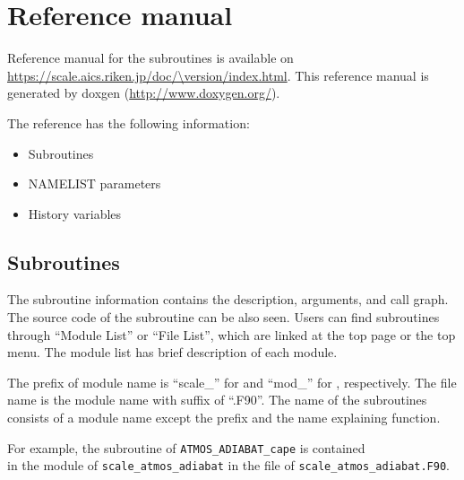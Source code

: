 \section{Reference manual} \label{sec:reference_manual}
Reference manual for the \scalelib subroutines is available on\\
\url{https://scale.aics.riken.jp/doc/\version/index.html}.
This reference manual is generated by doxgen (\url{http://www.doxygen.org/}).

The reference has the following information:
\begin{itemize}
\item Subroutines
\item NAMELIST parameters
\item History variables
\end{itemize}


\subsection{Subroutines}
The subroutine information contains the description, arguments, and call graph.
The source code of the subroutine can be also seen.
Users can find subroutines through ``Module List'' or ``File List'', which are linked at the top page or the top menu.
The module list has brief description of each module.

The prefix of module name is ``scale\_'' for \scalelib and ``mod\_'' for \scalerm, respectively.
The file name is the module name with suffix of ``.F90''.
The name of the subroutines consists of a module name except the prefix and the name explaining function.

For example, the subroutine of \verb|ATMOS_ADIABAT_cape| is contained \\
in the module of \verb|scale_atmos_adiabat| in the file of \verb|scale_atmos_adiabat.F90|.




